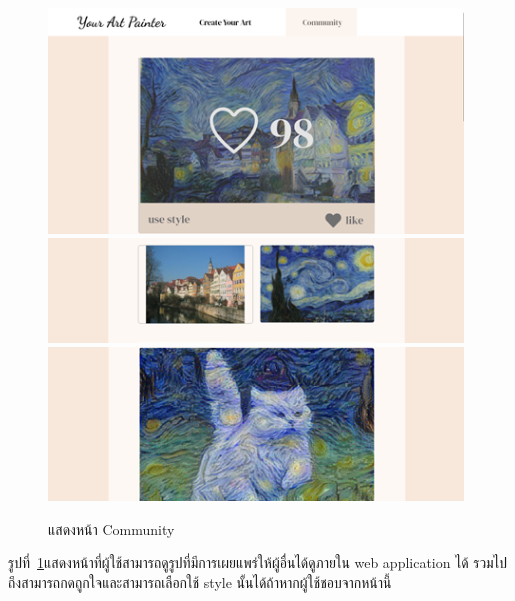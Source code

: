 \documentclass[12pt,oneside,openright,a4paper]{cpe-thai-project}
\begin{document}
\newpage

\begin{figure}[!h]
  \centering
  \includegraphics[width=11cm]{./image/ui-commu1.png}
  \includegraphics[width=11cm]{./image/ui-commu2.png}
  \includegraphics[width=11cm]{./image/ui-commu3.png}
  \caption{แสดงหน้า Community}
  \label{fig:ui-commu}
\end{figure}

\par\setlength{\parindent}{5ex}
รูปที่~\ref{fig:ui-commu}แสดงหน้าที่ผู้ใช้สามารถดูรูปที่มีการเผยแพร่ให้ผู้อื่นได้ดูภายใน web application ได้ รวมไปถึงสามารถกดถูกใจและสามารถเลือกใช้ style นั้นได้ถ้าหากผู้ใช้ชอบจากหน้านี้

\newpage
\end{document}
